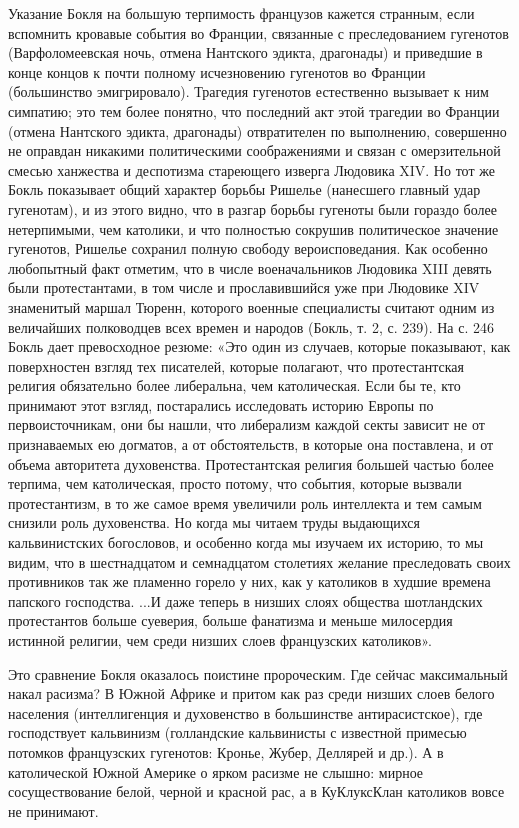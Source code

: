 Указание Бокля на большую терпимость французов кажется странным, если вспомнить
кровавые события во Франции, связанные с преследованием гугенотов
(Варфоломеевская ночь, отмена Нантского эдикта, драгонады) и приведшие в конце
концов к почти полному исчезновению гугенотов во Франции (большинство
эмигрировало). Трагедия гугенотов естественно вызывает к ним симпатию; это тем
более понятно, что последний акт этой трагедии во Франции (отмена Нантского
эдикта, драгонады) отвратителен по выполнению, совершенно не оправдан никакими
политическими соображениями и связан с омерзительной смесью ханжества и
деспотизма стареющего изверга Людовика XIV. Но тот же Бокль показывает общий
характер борьбы Ришелье (нанесшего главный удар гугенотам), и из этого видно,
что в разгар борьбы гугеноты были гораздо более нетерпимыми, чем католики, и
что полностью сокрушив политическое значение гугенотов, Ришелье сохранил полную
свободу вероисповедания. Как особенно любопытный факт отметим, что в числе
военачальников Людовика XIII девять были протестантами, в том числе и
прославившийся уже при Людовике XIV знаменитый маршал Тюренн, которого военные
специалисты считают одним из величайших полководцев всех времен и народов
(Бокль, т. 2, с. 239). На с. 246 Бокль дает превосходное резюме: «Это один из
случаев, которые показывают, как поверхностен взгляд тех писателей, которые
полагают, что протестантская религия обязательно более либеральна, чем
католическая. Если бы те, кто принимают этот взгляд, постарались исследовать
историю Европы по первоисточникам, они бы
нашли, что либерализм каждой секты зависит не от признаваемых ею догматов, а от
обстоятельств, в которые она поставлена, и от объема авторитета духовенства.
Протестантская религия большей частью более терпима, чем католическая, просто
потому, что события, которые вызвали протестантизм, в то же самое время
увеличили роль интеллекта и тем самым снизили роль духовенства. Но когда мы
читаем труды выдающихся кальвинистских богословов, и особенно когда мы изучаем
их историю, то мы видим, что в шестнадцатом и семнадцатом столетиях желание
преследовать своих противников так же пламенно горело у них, как у католиков в
худшие времена папского господства. ...И даже теперь в низших слоях общества
шотландских протестантов больше суеверия, больше фанатизма и меньше милосердия
истинной религии, чем среди низших слоев французских католиков».

Это сравнение Бокля оказалось поистине пророческим. Где сейчас максимальный
накал расизма? В Южной Африке и притом как раз среди низших слоев белого
населения (интеллигенция и духовенство в большинстве антирасистское), где
господствует кальвинизм (голландские кальвинисты с известной примесью потомков
французских гугенотов: Кронье, Жубер, Деллярей и др.). А в католической Южной
Америке о ярком расизме не слышно: мирное сосуществование белой, черной и
красной рас, а в КуКлуксКлан католиков вовсе не принимают.

